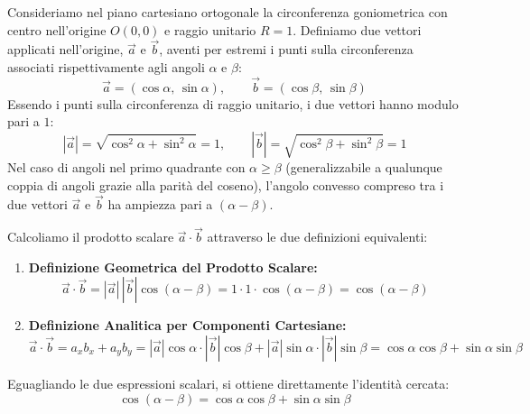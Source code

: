 \documentclass[11pt,a4paper,oneside]{report}
\begin{document}
\begin{dimostrazione}
Consideriamo nel piano cartesiano ortogonale la circonferenza goniometrica con centro nell'origine $O(0, 0)$ e raggio unitario $R = 1$.
Definiamo due vettori applicati nell'origine, $\vec{a}$ e $\vec{b}$, aventi per estremi i punti sulla circonferenza associati rispettivamente agli angoli $\alpha$ e $\beta$:
\begin{equation}
    \vec{a} = (\cos\alpha, \, \sin\alpha), \qquad \vec{b} = (\cos\beta, \, \sin\beta)
\end{equation}
Essendo i punti sulla circonferenza di raggio unitario, i due vettori hanno modulo pari a $1$:
\begin{equation}
    |\vec{a}| = \sqrt{\cos^2\alpha + \sin^2\alpha} = 1, \qquad |\vec{b}| = \sqrt{\cos^2\beta + \sin^2\beta} = 1
\end{equation}
Nel caso di angoli nel primo quadrante con $\alpha \ge \beta$ (generalizzabile a qualunque coppia di angoli grazie alla parit\`a del coseno), l'angolo convesso compreso tra i due vettori $\vec{a}$ e $\vec{b}$ ha ampiezza pari a $(\alpha - \beta)$.

Calcoliamo il prodotto scalare $\vec{a} \cdot \vec{b}$ attraverso le due definizioni equivalenti:
\begin{enumerate}[leftmargin=2em]
    \item \textbf{Definizione Geometrica del Prodotto Scalare:}
    \begin{equation}
        \vec{a} \cdot \vec{b} = |\vec{a}| \, |\vec{b}| \cos(\alpha - \beta) = 1 \cdot 1 \cdot \cos(\alpha - \beta) = \cos(\alpha - \beta)
    \end{equation}
    \item \textbf{Definizione Analitica per Componenti Cartesiane:}
    \begin{equation}
        \vec{a} \cdot \vec{b} = a_x b_x + a_y b_y = |\vec{a}|\cos\alpha \cdot |\vec{b}|\cos\beta + |\vec{a}|\sin\alpha \cdot |\vec{b}|\sin\beta = \cos\alpha\cos\beta + \sin\alpha\sin\beta
    \end{equation}
\end{enumerate}
Eguagliando le due espressioni scalari, si ottiene direttamente l'identit\`a cercata:
\begin{equation}
    \cos(\alpha - \beta) = \cos\alpha\cos\beta + \sin\alpha\sin\beta
\end{equation}
\end{dimostrazione}
\end{document}
